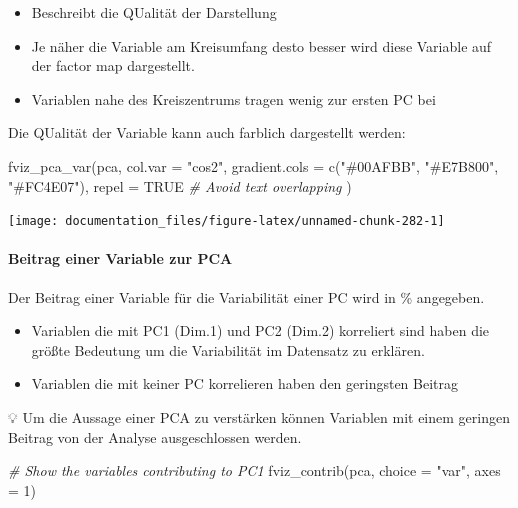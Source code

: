 \documentclass[
]{article}
\newenvironment{Shaded}{\begin{snugshade}}{\end{snugshade}}
\newcommand{\AttributeTok}[1]{\textcolor[rgb]{0.77,0.63,0.00}{#1}}
\newcommand{\CommentTok}[1]{\textcolor[rgb]{0.56,0.35,0.01}{\textit{#1}}}
\newcommand{\ConstantTok}[1]{\textcolor[rgb]{0.00,0.00,0.00}{#1}}
\newcommand{\DecValTok}[1]{\textcolor[rgb]{0.00,0.00,0.81}{#1}}
\newcommand{\FunctionTok}[1]{\textcolor[rgb]{0.00,0.00,0.00}{#1}}
\newcommand{\NormalTok}[1]{#1}
\newcommand{\StringTok}[1]{\textcolor[rgb]{0.31,0.60,0.02}{#1}}
\providecommand{\tightlist}{%
  \setlength{\itemsep}{0pt}\setlength{\parskip}{0pt}}
\begin{document}
\begin{itemize}
\tightlist
\item
  Beschreibt die QUalität der Darstellung
\item
  Je näher die Variable am Kreisumfang desto besser wird diese Variable auf der factor map dargestellt.
\item
  Variablen nahe des Kreiszentrums tragen wenig zur ersten PC bei
\end{itemize}

Die QUalität der Variable kann auch farblich dargestellt werden:

\begin{Shaded}
\begin{Highlighting}[]
\FunctionTok{fviz\_pca\_var}\NormalTok{(pca, }\AttributeTok{col.var =} \StringTok{"cos2"}\NormalTok{, }\AttributeTok{gradient.cols =} \FunctionTok{c}\NormalTok{(}\StringTok{"\#00AFBB"}\NormalTok{, }\StringTok{"\#E7B800"}\NormalTok{, }\StringTok{"\#FC4E07"}\NormalTok{), }
             \AttributeTok{repel =} \ConstantTok{TRUE} \CommentTok{\# Avoid text overlapping}
\NormalTok{             )}
\end{Highlighting}
\end{Shaded}

\begin{center}\texttt{[image: documentation\_files/figure-latex/unnamed-chunk-282-1]} \end{center}

\hypertarget{beitrag-einer-variable-zur-pca}{%
\paragraph{Beitrag einer Variable zur PCA}\label{beitrag-einer-variable-zur-pca}}

Der Beitrag einer Variable für die Variabilität einer PC wird in \% angegeben.

\begin{itemize}
\tightlist
\item
  Variablen die mit PC1 (Dim.1) und PC2 (Dim.2) korreliert sind haben die größte Bedeutung um die Variabilität im Datensatz zu erklären.
\item
  Variablen die mit keiner PC korrelieren haben den geringsten Beitrag
\end{itemize}

💡 Um die Aussage einer PCA zu verstärken können Variablen mit einem geringen Beitrag von der Analyse ausgeschlossen werden.

\begin{Shaded}
\begin{Highlighting}[]
\CommentTok{\# Show the variables contributing to PC1}
\FunctionTok{fviz\_contrib}\NormalTok{(pca, }\AttributeTok{choice =} \StringTok{"var"}\NormalTok{, }\AttributeTok{axes =} \DecValTok{1}\NormalTok{)}
\end{Highlighting}
\end{Shaded}
\end{document}
